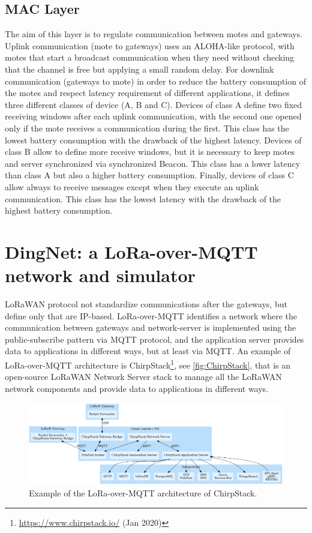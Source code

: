 \subsection{MAC Layer}
The aim of this layer is to regulate communication between motes and gateways.
% 
Uplink communication (mote to gateways) uses an ALOHA-like protocol, with motes that start a broadcast communication when they need without checking that the channel is free but applying a small random delay.
% 
For downlink communication (gateways to mote) in order to reduce the battery consumption of the motes and respect latency requirement of different applications, it defines three different classes of device (A, B and C).
% 
Devices of class A define two fixed receiving windows after each uplink communication, with the second one opened only if the mote receives a communication during the first. 
% 
This class has the lowest battery consumption with the drawback of the highest latency. 
% 
Devices of class B allow to define more receive windows, but it is necessary to keep motes and server synchronized via synchronized Beacon. 
% 
This class has a lower latency than class A but also a higher battery consumption. 
% 
Finally, devices of class C allow always to receive messages except when they execute an uplink communication. 
% 
This class has the lowest latency with the drawback of the highest battery consumption.

\section{DingNet: a LoRa-over-MQTT network and simulator}
LoRaWAN protocol not standardize communications after the gateways, but define only that are IP-based.
% 
LoRa-over-MQTT identifies a network where the communication between gateways and network-server is implemented using the public-subscribe pattern via MQTT protocol, and the application server provides data to applications in different ways, but at least via MQTT.
% 
An example of LoRa-over-MQTT architecture is ChirpStack\footnote{\href{https://www.chirpstack.io/}{https://www.chirpstack.io/} (Jan 2020)}, see \autoref{fig:ChirpStack}, that is an open-source LoRaWAN Network Server stack to manage all the LoRaWAN network components and provide data to applications in different ways.

\begin{figure}[h]
    \centering
    \includegraphics[width=\textwidth]{figures/chirpstack.png}
    \caption{Example of the LoRa-over-MQTT architecture of ChirpStack.~\cite{chirpstack2020}}
    \label{fig:ChirpStack}
\end{figure}

